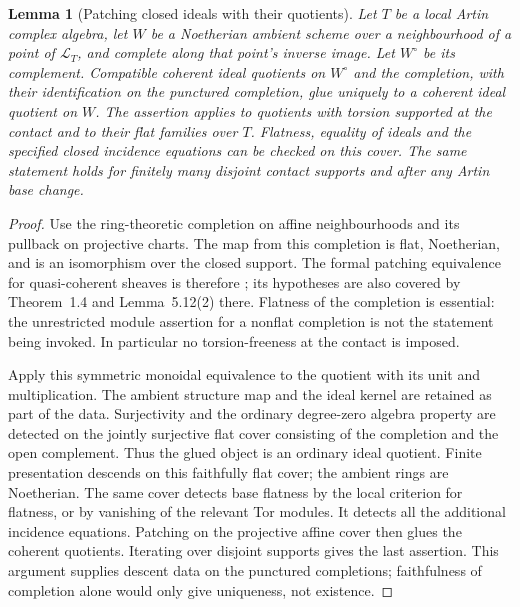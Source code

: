 \documentclass[11pt,reqno]{amsart}
\numberwithin{equation}{section}
\newtheorem{lemma}[theorem]{Lemma}
\theoremstyle{definition}\newtheorem{definition}[theorem]{Definition}
\theoremstyle{remark}\newtheorem{remark}[theorem]{Remark}
\begin{document}
\begin{lemma}[Patching closed ideals with their quotients]
\label{lem:ideal-patching-v163}
Let $T$ be a local Artin complex algebra, let $W$ be a Noetherian
ambient scheme over a neighbourhood of a point of $\mathcal L_T$,
and complete along that point's inverse image. Let $W^\circ$ be
its complement. Compatible coherent ideal quotients on $W^\circ$
and the completion, with their identification on the punctured
completion, glue uniquely to a coherent ideal quotient on $W$.
The assertion applies to quotients with torsion supported at the
contact and to their flat families over $T$. Flatness, equality of
ideals and the specified closed incidence equations can be checked
on this cover. The same statement holds for finitely many disjoint
contact supports and after any Artin base change.
\end{lemma}
\begin{proof}
Use the ring-theoretic completion on affine neighbourhoods and its
pullback on projective charts. The map from this completion is flat,
Noetherian, and is an isomorphism over the closed support. The
formal patching equivalence for quasi-coherent sheaves is therefore
\cite[Proposition~5.6(4), Example~5.8]{Bhatt163}; its hypotheses are
also covered by Theorem~1.4 and Lemma~5.12(2) there. Flatness of the
completion is essential: the unrestricted module assertion for a
nonflat completion is not the statement being invoked. In
particular no torsion-freeness at the contact is imposed.

Apply this symmetric monoidal equivalence to the quotient with its
unit and multiplication. The ambient structure map and the ideal
kernel are retained as part of the data. Surjectivity and the
ordinary degree-zero algebra property are detected on the jointly
surjective flat cover consisting of the completion and the open
complement. Thus the glued object is an ordinary ideal quotient.
Finite presentation descends on this faithfully flat cover; the
ambient rings are Noetherian. The same cover detects base flatness
by the local criterion for flatness, or by vanishing of the relevant
Tor modules. It detects all the additional incidence equations.
Patching on the projective affine cover then glues the coherent
quotients. Iterating over disjoint supports gives the last assertion.
This argument supplies descent data on the punctured completions;
faithfulness of completion alone would only give uniqueness, not
existence.
\end{proof}
\end{document}
